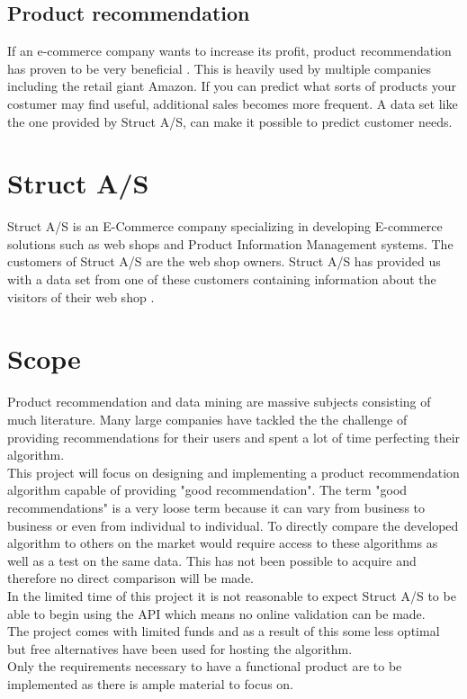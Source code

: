 \color{black}
\subsection{Product recommendation}
If an e-commerce company wants to increase its profit, product recommendation has proven to be very beneficial \cite{BigCommerce}. This is heavily used by multiple companies including the retail giant Amazon\cite{Fortune}. If you can predict what sorts of products your costumer may find useful, additional sales becomes more frequent. A data set like the one provided by Struct A/S, can make it possible to predict customer needs.

\section{Struct A/S}
Struct A/S is an E-Commerce company specializing in developing E-commerce solutions such as web shops and Product Information Management systems. The customers of Struct A/S are the web shop owners. Struct A/S has provided us with a data set from one of these customers containing information about the visitors of their web shop \cite{Struct}.


\section{Scope}
Product recommendation and data mining are massive subjects consisting of much literature. Many large companies have tackled the the challenge of providing recommendations for their users and spent a lot of time perfecting their algorithm.\\
This project will focus on designing and implementing a product recommendation algorithm capable of providing "good recommendation". The term "good recommendations" is a very loose term because it can vary from business to business or even from individual to individual. To directly compare the developed algorithm to others on the market would require access to these algorithms as well as a test on the same data. This has not been possible to acquire and therefore no direct comparison will be made. \\
In the limited time of this project it is not reasonable to expect Struct A/S to be able to begin using the API which means no online validation can be made. \\
The project comes with limited funds and as a result of this some less optimal but free alternatives have been used for hosting the algorithm. \\
Only the requirements necessary to have a functional product are to be implemented as there is ample material to focus on.
